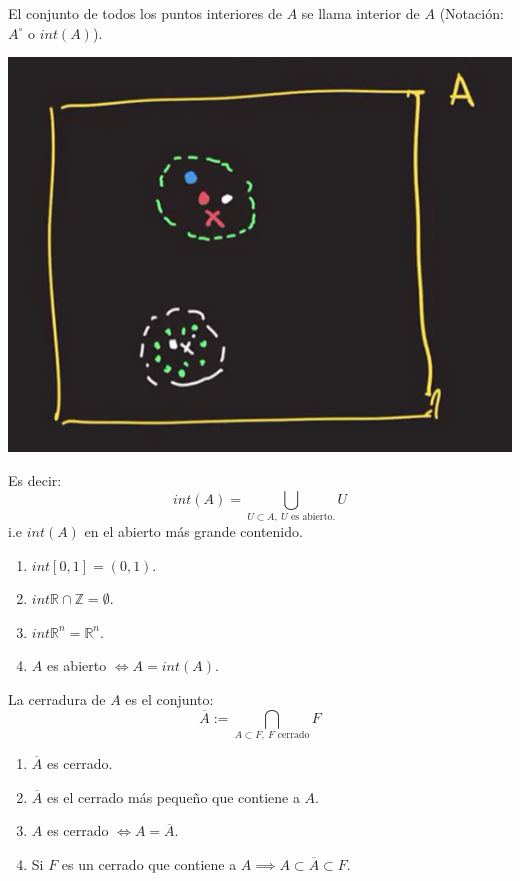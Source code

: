 \begin{definicion}
	El conjunto de todos los puntos interiores de $A$ se llama interior de $A$ (Notación: $A^\circ$ o $int(A)$). 
	\begin{center}
		\includegraphics[scale=0.4]{images/2/12}
	\end{center}
	Es decir: 
	$$int(A)=\bigcup_{U\subset A, \  U \text{ es abierto.}} U$$
	i.e $int(A)$ en el abierto más grande contenido. 
	\begin{ejemplo}
		\begin{enumerate}
			\item $int[0,1]=(0,1)$. 
			\item $int \mathbb{R}\cap \mathbb{Z}=\emptyset$. 
			\item $int\mathbb{R}^n=\mathbb{R}^n$.
			\item $A$ es abierto $\iff A=int(A)$. 
		\end{enumerate}
	\end{ejemplo}
\end{definicion}

\begin{ejemplo}
	La cerradura de $A$ es el conjunto: 
	$$\overline{A}:= \bigcap_{A\subset F, \ \text{$F$ cerrado}} F $$
	\begin{nota}
		\begin{enumerate}
			\item $\overline{A}$ es cerrado. 
			\item $\overline{A}$ es el cerrado más pequeño que contiene a $A$. 
			\item $A$ es cerrado $\iff A=\overline{A}$. 
			\item Si $F$ es un cerrado que contiene a $A\implies A\subset \overline{A}\subset F$. 
		\end{enumerate}
	\end{nota}
\end{ejemplo}

